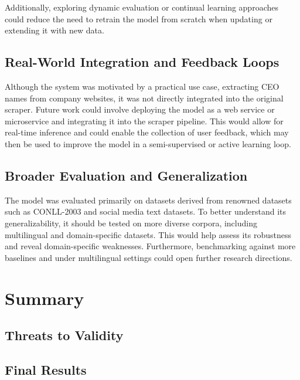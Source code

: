 \documentclass[a4paper]{usiinfbachelorproject}
\begin{document}
Additionally, exploring dynamic evaluation or continual learning approaches could reduce the need to retrain the model from scratch when updating or extending it with new data.

\subsection{Real-World Integration and Feedback Loops}

Although the system was motivated by a practical use case, extracting CEO names from company websites, it was not directly integrated into the original scraper. Future work could involve deploying the model as a web service or microservice and integrating it into the scraper pipeline. This would allow for real-time inference and could enable the collection of user feedback, which may then be used to improve the model in a semi-supervised or active learning loop.

\subsection{Broader Evaluation and Generalization}

The model was evaluated primarily on datasets derived from renowned datasets such as CONLL-2003 and social media text datasets. To better understand its generalizability, it should be tested on more diverse corpora, including multilingual and domain-specific datasets. This would help assess its robustness and reveal domain-specific weaknesses. Furthermore, benchmarking against more baselines and under multilingual settings could open further research directions.


\section{\textbf{Summary}}
\subsection{Threats to Validity}
\subsection{Final Results}







\newpage
	


\end{document}
